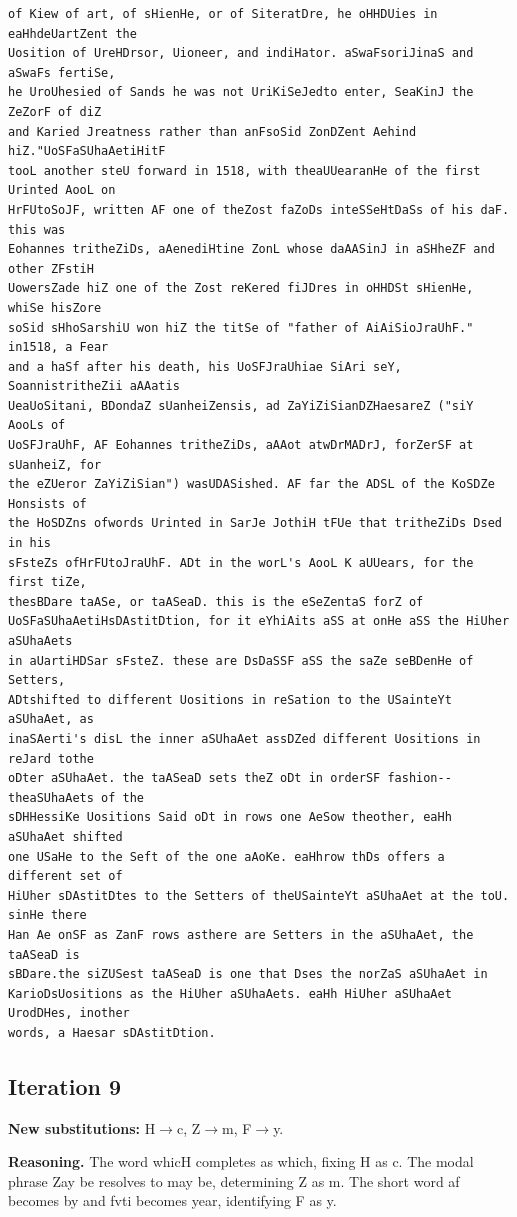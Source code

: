 \documentclass[12pt,a4paper]{article}
\begin{document}
\begin{lstlisting}[caption={Complete text after iteration 8}, label={lst:iter8}]
of Kiew of art, of sHienHe, or of SiteratDre, he oHHDUies in eaHhdeUartZent the
Uosition of UreHDrsor, Uioneer, and indiHator. aSwaFsoriJinaS and aSwaFs fertiSe,
he UroUhesied of Sands he was not UriKiSeJedto enter, SeaKinJ the ZeZorF of diZ
and Karied Jreatness rather than anFsoSid ZonDZent Aehind hiZ."UoSFaSUhaAetiHitF
tooL another steU forward in 1518, with theaUUearanHe of the first Urinted AooL on
HrFUtoSoJF, written AF one of theZost faZoDs inteSSeHtDaSs of his daF. this was
Eohannes tritheZiDs, aAenediHtine ZonL whose daAASinJ in aSHheZF and other ZFstiH
UowersZade hiZ one of the Zost reKered fiJDres in oHHDSt sHienHe, whiSe hisZore
soSid sHhoSarshiU won hiZ the titSe of "father of AiAiSioJraUhF." in1518, a Fear
and a haSf after his death, his UoSFJraUhiae SiAri seY, SoannistritheZii aAAatis
UeaUoSitani, BDondaZ sUanheiZensis, ad ZaYiZiSianDZHaesareZ ("siY AooLs of
UoSFJraUhF, AF Eohannes tritheZiDs, aAAot atwDrMADrJ, forZerSF at sUanheiZ, for
the eZUeror ZaYiZiSian") wasUDASished. AF far the ADSL of the KoSDZe Honsists of
the HoSDZns ofwords Urinted in SarJe JothiH tFUe that tritheZiDs Dsed in his
sFsteZs ofHrFUtoJraUhF. ADt in the worL's AooL K aUUears, for the first tiZe,
thesBDare taASe, or taASeaD. this is the eSeZentaS forZ of
UoSFaSUhaAetiHsDAstitDtion, for it eYhiAits aSS at onHe aSS the HiUher aSUhaAets
in aUartiHDSar sFsteZ. these are DsDaSSF aSS the saZe seBDenHe of Setters,
ADtshifted to different Uositions in reSation to the USainteYt aSUhaAet, as
inaSAerti's disL the inner aSUhaAet assDZed different Uositions in reJard tothe
oDter aSUhaAet. the taASeaD sets theZ oDt in orderSF fashion--theaSUhaAets of the
sDHHessiKe Uositions Said oDt in rows one AeSow theother, eaHh aSUhaAet shifted
one USaHe to the Seft of the one aAoKe. eaHhrow thDs offers a different set of
HiUher sDAstitDtes to the Setters of theUSainteYt aSUhaAet at the toU. sinHe there
Han Ae onSF as ZanF rows asthere are Setters in the aSUhaAet, the taASeaD is
sBDare.the siZUSest taASeaD is one that Dses the norZaS aSUhaAet in
KarioDsUositions as the HiUher aSUhaAets. eaHh HiUher aSUhaAet UrodDHes, inother
words, a Haesar sDAstitDtion.
\end{lstlisting}

\clearpage
\subsection{Iteration 9}
\textbf{New substitutions:} H$\to$c, Z$\to$m, F$\to$y.

\textbf{Reasoning.} The word whicH completes as which, fixing H as c. The modal phrase Zay be resolves to may be, determining Z as m. The short word af becomes by and fvti becomes year, identifying F as y.
\end{document}
